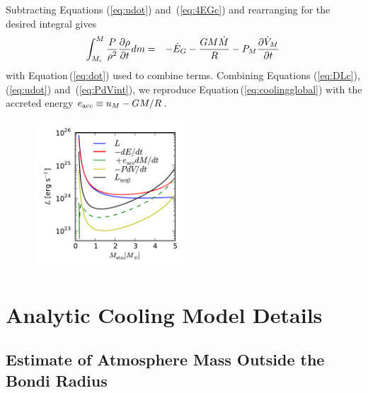 \documentclass[apj]{emulateapj}
\newcommand{\p}{\partial}
\newcommand{\Eq}[1]{Equation\,(\ref{#1})}
\newcommand{\Eqs}[2]{Equations (\ref{#1}) and~(\ref{#2})}
\newcommand{\Eqsss}[3]{Equations (\ref{#1}), (\ref{#2}) and~(\ref{#3})}
\newcommand{\co}{_{\rm c}}
\newcommand{\surf}{_M}
\begin{document}
Subtracting \Eqs{eq:udot}{eq:4EGc} and rearranging for the desired integral gives
\begin{eqnarray}\label{eq:PdVint}
\int_{M\co}^M {P \over \rho^2} {\p \rho \over \p t} dm  &=&  - \dot{E}_G - {G M \dot{M} \over R} - P\surf {\p \dot{V}\surf \over \p t} \,  
\end{eqnarray} 
with \Eq{eq:dot} used to combine terms.  Combining \Eqsss{eq:DLc}{eq:udot}{eq:PdVint}, we reproduce \Eq{eq:coolingglobal} with the accreted energy $e_{\rm acc} \equiv u\surf - GM/R$.  

\begin{figure}[tb]
\centering
\includegraphics[width=0.5\textwidth]{../../figs/ModelAtmospheres/RadSelfGravPoly/PaperFigs/cooling_a10_Mc5_rcb.pdf}
\caption{}
\end{figure}



\section{Analytic Cooling Model Details}\label{sec:analytic}

\subsection{Estimate of Atmosphere Mass Outside the Bondi Radius}
\end{document}
